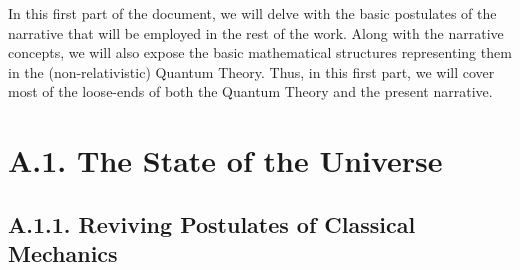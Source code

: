 \documentclass[11pt, a4paper]{article} %
\begin{document}
In this first part of the document, we will delve with the basic postulates of the narrative that will be employed in the rest of the work. Along with the narrative concepts, we will also expose the basic mathematical structures representing them in the (non-relativistic) Quantum Theory. Thus, in this first part, we will cover most of the loose-ends of both the Quantum Theory and the present narrative.
\newpage


\section*{A.1. The State of the Universe}\vspace{-0.2cm}

\subsection*{A.1.1. Reviving Postulates of Classical Mechanics}\vspace{-0.2cm}
\end{document}

